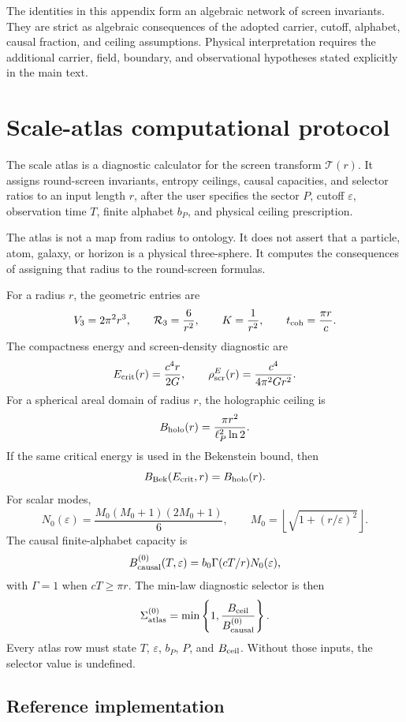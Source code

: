 \documentclass[11pt,a4paper]{article}
\begin{document}
The identities in this appendix form an algebraic network of screen invariants.  They are strict as algebraic consequences of the adopted carrier, cutoff, alphabet, causal fraction, and ceiling assumptions.  Physical interpretation requires the additional carrier, field, boundary, and observational hypotheses stated explicitly in the main text.



\section{Scale-atlas computational protocol}
\label{app:scale-atlas-protocol}

The scale atlas is a diagnostic calculator for the screen transform \(\mathcal T(r)\).  It assigns round-screen invariants, entropy ceilings, causal capacities, and selector ratios to an input length \(r\), after the user specifies the sector \(P\), cutoff \(\varepsilon\), observation time \(T\), finite alphabet \(b_P\), and physical ceiling prescription.

The atlas is not a map from radius to ontology.  It does not assert that a particle, atom, galaxy, or horizon is a physical three-sphere.  It computes the consequences of assigning that radius to the round-screen formulas.

For a radius \(r\), the geometric entries are
\[
V_3=2\pi^2r^3,\qquad
\mathcal R_3=\frac6{r^2},
\qquad
K=\frac1{r^2},
\qquad
t_{\rm coh}=\frac{\pi r}{c}.
\]
The compactness energy and screen-density diagnostic are
\[
E_{\rm crit}(r)=\frac{c^4r}{2G},
\qquad
\rho_{\rm scr}^{E}(r)=\frac{c^4}{4\pi^2G r^2}.
\]
For a spherical areal domain of radius \(r\), the holographic ceiling is
\[
B_{\rm holo}(r)=\frac{\pi r^2}{\ell_P^2\ln2}.
\]
If the same critical energy is used in the Bekenstein bound, then
\[
B_{\rm Bek}(E_{\rm crit},r)=B_{\rm holo}(r).
\]
For scalar modes,
\[
N_0(\varepsilon)
=
\frac{M_0(M_0+1)(2M_0+1)}6,
\qquad
M_0=\left\lfloor \sqrt{1+(r/\varepsilon)^2}\right\rfloor .
\]
The causal finite-alphabet capacity is
\[
B_{\rm causal}^{(0)}(T,\varepsilon)
=
b_0\Gamma(cT/r)N_0(\varepsilon),
\]
with \(\Gamma=1\) when \(cT\ge\pi r\).  The min-law diagnostic selector is then
\[
\Sigma_{\rm atlas}^{(0)}
=
\min\left\{
1,
\frac{B_{\rm ceil}}{B_{\rm causal}^{(0)}}
\right\}.
\]
Every atlas row must state \(T\), \(\varepsilon\), \(b_P\), \(P\), and \(B_{\rm ceil}\).  Without those inputs, the selector value is undefined.

\subsection{Reference implementation}
\end{document}
